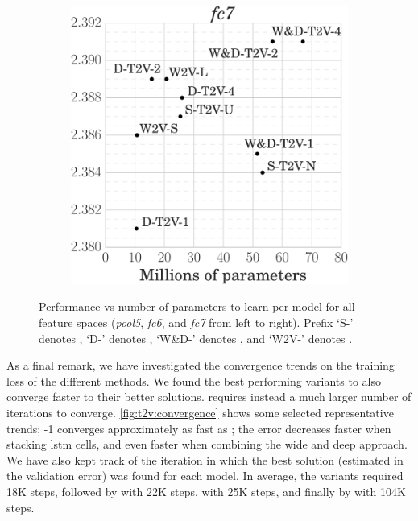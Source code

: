 \begin{figure}
\begin{subfigure}{.31\linewidth}
\end{subfigure}%
\hfill
\begin{subfigure}{.31\linewidth}
\includegraphics[width=\linewidth]{performance-size-fc7}
\end{subfigure}
\caption{Performance vs number of parameters to learn per model for all feature spaces (\emph{pool5}, \emph{fc6}, and \emph{fc7} from left to right).
Prefix `S-' denotes \sparsettv{}, `D-' denotes \densettv{}, `W\&D-' denotes \widedeepttv{}, and `W2V-' denotes \wordvisual{}.
}
\label{fig:t2v:performance-size}
\end{figure}

As a final remark, we have investigated the convergence trends on the training loss of the different methods.
We found the best performing \ttv{} variants to also converge faster to their better solutions.
\wordvisual{} requires instead a much larger number of iterations to converge.
\ref{fig:t2v:convergence} shows some selected representative trends;
\densettv{}-1 converges approximately as fast as \sparsettv{};
the error decreases faster when stacking \gls{lstm} cells, and even faster when combining the wide and deep approach.
We have also kept track of the iteration in which the best solution (estimated in the validation error) was found for each model.
In average, the \widedeepttv{} variants required 18K steps, followed by \densettv{} with 22K steps, \sparsettv{} with 25K steps, and finally by \wordvisual{} with 104K steps.

